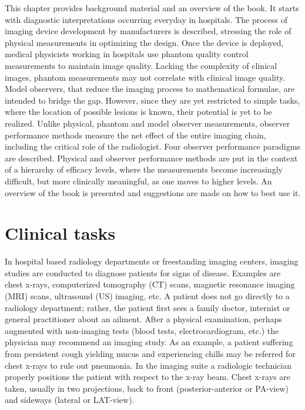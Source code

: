 \documentclass[
]{book}
\begin{document}
This chapter provides background material and an overview of the book. It starts with diagnostic interpretations occurring everyday in hospitals. The process of imaging device development by manufacturers is described, stressing the role of physical measurements in optimizing the design. Once the device is deployed, medical physicists working in hospitals use phantom quality control measurements to maintain image quality. Lacking the complexity of clinical images, phantom measurements may not correlate with clinical image quality. Model observers, that reduce the imaging process to mathematical formulae, are intended to bridge the gap. However, since they are yet restricted to simple tasks, where the location of possible lesions is known, their potential is yet to be realized. Unlike physical, phantom and model observer measurements, observer performance methods measure the net effect of the entire imaging chain, including the critical role of the radiologist. Four observer performance paradigms are described. Physical and observer performance methods are put in the context of a hierarchy of efficacy levels, where the measurements become increasingly difficult, but more clinically meaningful, as one moves to higher levels. An overview of the book is presented and suggestions are made on how to best use it.

\hypertarget{clinical-tasks}{%
\section{Clinical tasks}\label{clinical-tasks}}

In hospital based radiology departments or freestanding imaging centers, imaging studies are conducted to diagnose patients for signs of disease. Examples are chest x-rays, computerized tomography (CT) scans, magnetic resonance imaging (MRI) scans, ultrasound (US) imaging, etc. A patient does not go directly to a radiology department; rather, the patient first sees a family doctor, internist or general practitioner about an ailment. After a physical examination, perhaps augmented with non-imaging tests (blood tests, electrocardiogram, etc.) the physician may recommend an imaging study. As an example, a patient suffering from persistent cough yielding mucus and experiencing chills may be referred for chest x-rays to rule out pneumonia. In the imaging suite a radiologic technician properly positions the patient with respect to the x-ray beam. Chest x-rays are taken, usually in two projections, back to front (posterior-anterior or PA-view) and sideways (lateral or LAT-view).
\end{document}
